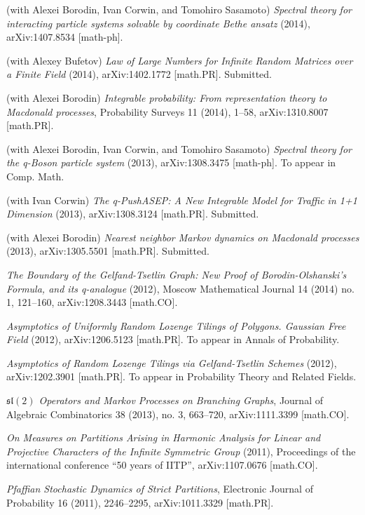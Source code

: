 \documentclass[letterpaper,11pt]{article}
\begin{document}
\begin{etaremune}
    \renewcommand{\labelenumi}{[\theenumi]}
    \item (with Alexei Borodin, Ivan Corwin, and Tomohiro Sasamoto)
    \emph{Spectral theory for interacting particle systems solvable by coordinate Bethe ansatz} (2014), arXiv:1407.8534 [math-ph].
    \item (with Alexey Bufetov)
    \emph{Law of Large Numbers for Infinite Random Matrices over a Finite Field} (2014), arXiv:1402.1772 [math.PR].
    Submitted.
    \item (with Alexei Borodin) 
    \emph{Integrable probability: From representation theory to Macdonald processes}, 
    Probability Surveys 11 (2014), 1--58, arXiv:1310.8007 [math.PR]. 
    \item (with Alexei Borodin, Ivan Corwin, and Tomohiro Sasamoto)
    \emph{Spectral theory for the q-Boson particle system}
    (2013), arXiv:1308.3475 [math-ph]. To appear in Comp. Math.
    \item (with Ivan Corwin)
    \emph{The q-PushASEP: A New Integrable Model for Traffic in 1+1 Dimension} (2013), arXiv:1308.3124 [math.PR]. 
    Submitted.
    \item (with Alexei Borodin) 
    \emph{Nearest neighbor Markov dynamics on Macdonald processes} (2013), 
    arXiv:1305.5501 [math.PR].
    Submitted.
    \item \emph{The Boundary of the Gelfand-Tsetlin Graph: New Proof of Borodin-Olshanski's Formula, and its q-analogue} (2012), 
    Moscow Mathematical Journal 14 (2014) no. 1, 121--160,
    arXiv:1208.3443 [math.CO].
    \item \emph{Asymptotics of Uniformly Random Lozenge Tilings of Polygons. Gaussian Free Field} (2012), arXiv:1206.5123 [math.PR]. To appear in Annals of Probability.
    \item \emph{Asymptotics of Random Lozenge Tilings via Gelfand-Tsetlin Schemes} (2012), arXiv:1202.3901 [math.PR]. To
    appear in Probability Theory and Related Fields.
    \item \emph{$\mathfrak{sl}(2)$ Operators and Markov Processes on Branching Graphs},
    Journal of Algebraic Combinatorics 38 (2013), no. 3, 663--720,
    arXiv:1111.3399 [math.CO].
    \item \emph{On Measures on Partitions Arising in Harmonic Analysis for Linear and Projective Characters of the Infinite Symmetric Group} (2011), Proceedings of the international conference ``50 years of IITP'', arXiv:1107.0676 [math.CO].
    \item  \emph{Pfaffian Stochastic Dynamics of Strict Partitions},  Electronic Journal of Probability 16 (2011), 2246--2295, arXiv:1011.3329 [math.PR].

\end{etaremune}
\end{document}
